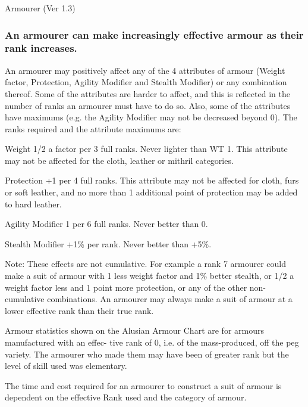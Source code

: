 \begin{Chapter}{Armourer (Ver 1.3)}
\subsubsection{An  armourer  can  make  increasingly  effective 
armour as their rank increases.}

An armourer may positively affect any of the 4 attributes of armour
(Weight factor, Protection, Agility Modifier and Stealth Modifier) or
any combination thereof.  Some of the attributes are harder to affect,
and this is reflected in the number of ranks an armourer must have to
do so.  Also, some of the attributes have maximums (e.g.  the Agility
Modifier may not be decreased beyond 0).  The ranks required and the
attribute maximums are:

\begin{Description}
\item[Weight] 1/2 a factor per 3 full ranks. Never lighter than WT 1.
  This attribute may not be affected for the cloth, leather or mithril
  categories.

\item[Protection] +1 per 4 full ranks.  This attribute may not be
  affected for cloth, furs or soft leather, and no more than 1
  additional point of protection may be added to hard leather.

\item[Agility Modifier] 1 per 6 full ranks.  Never better than 0.

\item[Stealth Modifier] +1\% per rank. Never better than +5\%.

\end{Description}

Note: These effects are not cumulative. For example a rank 7 armourer
could make a suit of armour with 1 less weight factor and 1\% better
stealth, or 1/2 a weight factor less and 1 point more protection, or
any of the other non-cumulative combinations.  An armourer may always
make a suit of armour at a lower effective rank than their true rank.

Armour statistics shown on the Alusian Armour Chart are for armours
manufactured with an effec- tive rank of 0, i.e.  of the
mass-produced, off the peg variety.  The armourer who made them may
have been of greater rank but the level of skill used was elementary.

The time and cost required for an armourer to construct a suit of
armour is dependent on the effective Rank used and the category of
armour.


\end{Chapter}
